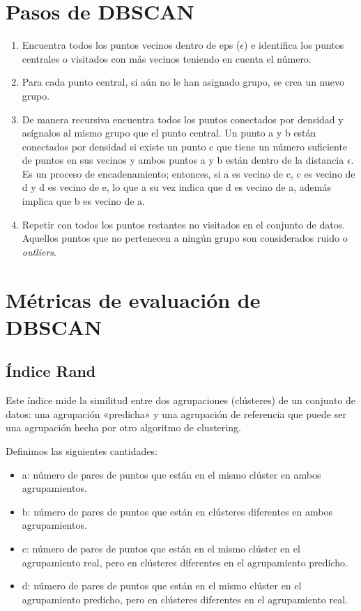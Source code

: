 \section{Pasos de DBSCAN}
\begin{enumerate}
    \item Encuentra todos los puntos vecinos dentro de eps ($\epsilon$) e identifica los puntos centrales o visitados con más vecinos teniendo en cuenta el número.
    \item  Para cada punto central, si aún no le han asignado grupo, se crea un nuevo grupo.

    \item  De manera recursiva encuentra todos los puntos conectados por densidad y asígnalos al mismo grupo que el punto central. Un punto a y b están conectados por densidad si existe un punto c que tiene un número suficiente de puntos en sus vecinos y ambos puntos a y b están dentro de la distancia $\epsilon$. Es un proceso de encadenamiento; entonces, si a es vecino de c, c es vecino de d y d es vecino de e, lo que a su vez indica que d es vecino de a, además implica que b es vecino de a.

    \item Repetir con todos los puntos restantes no visitados en el conjunto de datos. Aquellos puntos que no pertenecen a ningún grupo son considerados ruido o \textit{outliers}.
\end{enumerate}

\section{Métricas de evaluación de DBSCAN}

\subsection{Índice Rand}
 Este índice mide la similitud entre dos agrupaciones (clústeres) de un conjunto de datos: una agrupación «predicha» y una agrupación de referencia que puede ser una agrupación hecha por otro algoritmo de clustering. 

Definimos las siguientes cantidades: 

\begin{itemize}
     \item a: número de pares de puntos que están en el mismo clúster en ambos agrupamientos.
     \item b: número de pares de puntos que están en clústeres diferentes en ambos agrupamientos.

     \item c: número de pares de puntos que están en el mismo clúster en el agrupamiento real, pero en clústeres diferentes en el agrupamiento predicho.

     \item d: número de pares de puntos que están en el mismo clúster en el agrupamiento predicho, pero en clústeres diferentes en el agrupamiento real.
 \end{itemize}

